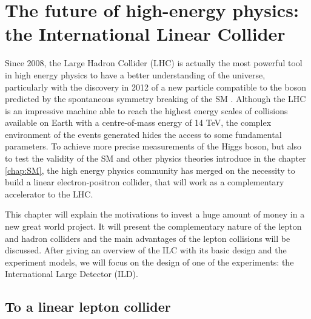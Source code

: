 \chapter[The ILC]{The future of high-energy physics: the International Linear Collider}
\label{chap:ILC}



  Since 2008, the Large Hadron Collider (LHC) is actually the most powerful tool in high energy physics to have a better understanding of the universe, particularly with the discovery in 2012 of a new particle compatible to the boson predicted by the spontaneous symmetry breaking of the SM \cite{Aad2012, Chatrchyan2012}.
  Although the LHC is an impressive machine able to reach the highest energy scales of collisions available on Earth with a centre-of-mass energy of 14 TeV, the complex environment of the events generated hides the access to some fundamental parameters. 
  To achieve more precise measurements of the Higgs boson, but also to test the validity of the SM and other physics theories introduce in the chapter \ref{chap:SM}, the high energy physics community has merged on the necessity to build a linear electron-positron collider, that will work as a complementary accelerator to the LHC.
  
  This chapter will explain the motivations to invest a huge amount of money in a new great world project. It will present the complementary nature of the lepton and hadron colliders and the main advantages of the lepton collisions will be discussed.
  After giving an overview of the ILC with its basic design and the experiment models, we will focus on the design of one of the experiments: the International Large Detector (ILD).

 \minitoc
  
  \section{To a linear lepton collider}
 
